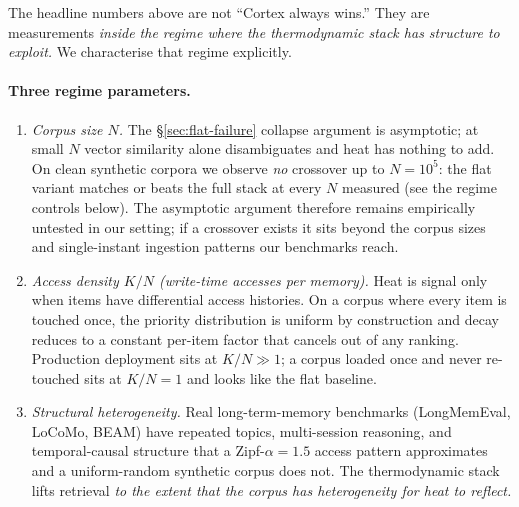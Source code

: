 \documentclass[11pt]{article}
\begin{document}
The headline numbers above are not ``Cortex always wins.''  They are
measurements \emph{inside the regime where the thermodynamic stack
has structure to exploit.}  We characterise that regime explicitly.

\paragraph{Three regime parameters.}
\begin{enumerate}
\item \emph{Corpus size $N$.}  The \S\ref{sec:flat-failure} collapse
  argument is asymptotic; at small $N$ vector similarity alone
  disambiguates and heat has nothing to add.  On clean synthetic
  corpora we observe \emph{no} crossover up to $N = 10^5$: the flat
  variant matches or beats the full stack at every $N$ measured
  (see the regime controls below).  The asymptotic argument
  therefore remains empirically untested in our setting; if a
  crossover exists it sits beyond the corpus sizes and
  single-instant ingestion patterns our benchmarks reach.
\item \emph{Access density $K/N$ (write-time accesses per memory).}
  Heat is signal only when items have differential access histories.
  On a corpus where every item is touched once, the priority
  distribution is uniform by construction and decay reduces to a
  constant per-item factor that cancels out of any ranking.
  Production deployment sits at $K/N \gg 1$; a corpus loaded once
  and never re-touched sits at $K/N = 1$ and looks like the flat
  baseline.
\item \emph{Structural heterogeneity.}  Real long-term-memory
  benchmarks (LongMemEval, LoCoMo, BEAM) have repeated topics,
  multi-session reasoning, and temporal-causal structure that a
  Zipf-$\alpha{=}1.5$ access pattern approximates and a
  uniform-random synthetic corpus does not.  The thermodynamic stack
  lifts retrieval \emph{to the extent that the corpus has
  heterogeneity for heat to reflect.}
\end{enumerate}
\end{document}
